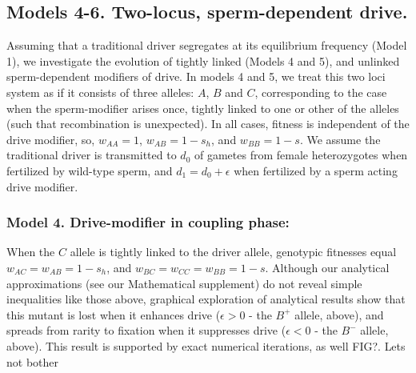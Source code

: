 \documentclass[12pt,letterpaper]{article}
\newcommand{\gc}[1]{{ \color{red} #1}}
\newcommand{\yb}[1]{{ \color{blue} #1}}
\begin{document}
\subsection*{Models 4-6. Two-locus, sperm-dependent drive.} 
Assuming that a traditional driver segregates at its equilibrium frequency (Model 1), we investigate the evolution of tightly linked (Models 4 and 5), and unlinked sperm-dependent modifiers of drive. 
In models 4 and 5, we treat this two loci system as if it consists of
three alleles: $A$, $B$ and $C$, corresponding to the case \gc{when the
sperm-modifier arises once, tightly linked to one or other of the
alleles (such that recombination is unexpected). }
In all cases, fitness is independent of the drive modifier, so, $w_{AA}=1$, $w_{AB}=1-s_h$, and $w_{BB} = 1-s$. 
We assume the traditional driver is transmitted to $d_0$ of gametes from female heterozygotes  when fertilized by wild-type sperm, and $d_1=d_0+\epsilon$ when fertilized by a sperm acting drive modifier.

\subsubsection*{Model 4. Drive-modifier in coupling phase:}
When the $C$ allele is tightly linked to the driver allele, 
	genotypic fitnesses equal $w_{AC}=w_{AB}=1-s_h$, and $w_{BC}=w_{CC}=w_{BB}=1-s$. 
Although our analytical approximations (see our \gc{Mathematical supplement}) do not reveal simple inequalities like those above,
	graphical exploration of analytical results show that this mutant is lost when it enhances drive ($\epsilon>0$ - the $B^+$ allele, above),
	and spreads from rarity to fixation when it suppresses drive ($\epsilon<0$ - the $B^-$ allele, above).	
This result is supported by exact numerical iterations, as well
\yb{FIG?}. \gc{Lets not bother}
\end{document}
